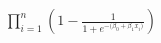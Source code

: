 \documentclass[preview]{standalone}
\begin{document}
\begin{align*}
\prod_{i=1}^{n}(1 - \frac{1}{1 + e^{-\big(\beta_0 + \beta_1x_i)}})
\end{align*}
\end{document}
